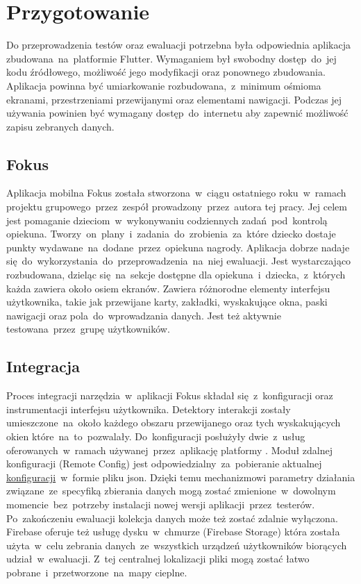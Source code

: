 \section{Przygotowanie}
Do przeprowadzenia testów oraz ewaluacji potrzebna była odpowiednia aplikacja zbudowana~na~platformie Flutter. Wymaganiem był swobodny dostęp~do~jej kodu źródłowego, możliwość jego modyfikacji oraz ponownego zbudowania. Aplikacja powinna być umiarkowanie rozbudowana,~z~minimum ośmioma ekranami, przestrzeniami przewijanymi oraz elementami nawigacji. Podczas jej używania powinien być wymagany dostęp~do~internetu aby zapewnić możliwość zapisu zebranych danych. 

\subsection{Fokus}
Aplikacja mobilna Fokus została stworzona~w~ciągu ostatniego roku~w~ramach projektu grupowego~przez~zespół prowadzony~przez~autora tej pracy. Jej celem jest pomaganie dzieciom~w~wykonywaniu codziennych zadań~pod~kontrolą opiekuna. Tworzy~on~plany~i~zadania~do~zrobienia~za~które dziecko dostaje punkty wydawane~na~dodane~przez~opiekuna nagrody. Aplikacja dobrze nadaje się~do~wykorzystania~do~przeprowadzenia~na~niej ewaluacji. Jest wystarczająco rozbudowana, dzieląc się~na~sekcje dostępne dla opiekuna~i~dziecka,~z~których każda zawiera około osiem ekranów. Zawiera różnorodne elementy interfejsu użytkownika, takie jak przewijane karty, zakładki, wyskakujące okna, paski nawigacji oraz pola~do~wprowadzania danych. Jest też aktywnie testowana~przez~grupę użytkowników.

\subsection{Integracja}
Proces integracji narzędzia~w~aplikacji Fokus składał się~z~konfiguracji oraz instrumentacji interfejsu użytkownika. Detektory interakcji zostały umieszczone~na~około każdego obszaru przewijanego oraz tych wyskakujących okien które~na~to~pozwalały. Do~konfiguracji posłużyły dwie~z~usług oferowanych~w~ramach używanej~przez~aplikację platformy . Moduł zdalnej konfiguracji (Remote Config) jest odpowiedzialny~za~pobieranie aktualnej \hyperref[sec:rs_config]{konfiguracji}~w~formie pliku json. Dzięki temu mechanizmowi parametry działania związane~ze~specyfiką zbierania danych mogą zostać zmienione~w~dowolnym momencie~bez~potrzeby instalacji nowej wersji aplikacji~przez~testerów. Po~zakończeniu ewaluacji kolekcja danych może też zostać zdalnie wyłączona. Firebase oferuje też usługę dysku~w~chmurze (Firebase Storage) która została użyta~w~celu zebrania danych~ze~wszystkich urządzeń użytkowników biorących udział~w~ewaluacji. Z~tej centralnej lokalizacji pliki mogą zostać łatwo pobrane~i~przetworzone~na~mapy cieplne.
